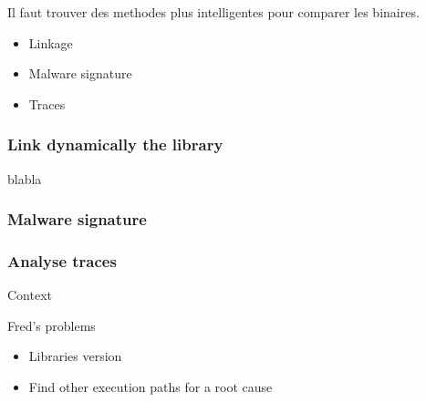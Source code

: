 \documentclass[11pt]{beamer}
\begin{document}
\begin{frame}

    Il faut trouver des methodes plus intelligentes pour comparer les
    binaires.

    \begin{itemize}
        \item Linkage 
        \item Malware signature
        \item Traces
    \end{itemize}

\end{frame}

\begin{frame}
    \frametitle{Link dynamically the library}
    blabla  
\end{frame}

\begin{frame}
    \frametitle{Malware signature}
\end{frame}

\begin{frame}
    \frametitle{Analyse traces} 
\end{frame}

\begin{frame}
    \begin{block}{Context}


    \end{block}

    \begin{block}{Fred's problems}

        \begin{itemize}
            \item Libraries version
            \item Find other execution paths for a root cause
        \end{itemize}

    \end{block}

\end{frame}
\end{document}
